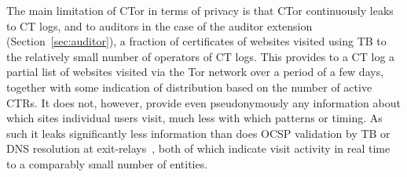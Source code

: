 The main limitation of CTor in terms of privacy is that CTor continuously leaks
to CT logs, and to auditors in the case of the auditor extension
(Section~\ref{sec:auditor}), a fraction of certificates of websites visited
using TB to the relatively small number of operators of CT logs.  This provides
to a CT log a partial list of websites visited via the Tor network over a period
of a few days, together with some indication of distribution based on the number
of active CTRs. It does not, however, provide even pseudonymously any
information about which sites individual users visit, much less with which
patterns or timing. As such it leaks significantly less information than does
OCSP validation by TB or DNS resolution at exit-relays~\cite{TorDNS}, both of
which indicate visit activity in real time to a comparably small number of
entities.
